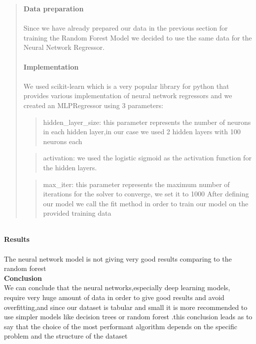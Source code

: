  \begin{quote}
\textbf{Data preparation}\\
\\
Since we have already prepared our data in the previous section for training the Random Forest Model we decided to use the same data for the Neural Network Regressor.\\
\\
\textbf{Implementation}\\
\\ 
We used scikit-learn which is a very popular library for python that provides various implementation of neural network regressors and we created an MLPRegressor using 3 parameters:\\
 \begin{quote}
hidden\_layer\_size: this parameter represents the number of neurons in each hidden layer,in our case we used 2 hidden layers with 100 neurons each\\
\end{quote}
 \begin{quote}
activation: we used the logistic sigmoid as the activation function for the hidden layers.\\
\end{quote}
 \begin{quote}
max\_iter: this parameter represents the maximum number of iterations for the solver to converge, we set it to 1000
After defining our model we call the fit method in order to train our model on the provided training data\\
\end{quote}
\end{quote}

\\
\noindent \textbf{Results}\\
\\
The neural network model is not giving very good results comparing to the random forest\\


\noindent \textbf{Conclusion}\\

\noindent We can conclude that the neural networks,especially deep learning models, require very huge amount of data in order to give good results and avoid overfitting,and since our dataset is tabular and small it is more recommended to use simpler models like decision trees or random forest .this conclusion leads as to say that the choice of the most performant algorithm depends on the specific problem and the structure of the dataset 


